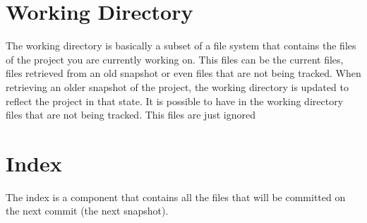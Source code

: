 \section{Working Directory}

The working directory is basically a subset of
a file system that contains the files of the project you are
currently working on. This files can be the current files, files
retrieved from an old snapshot or even files that are not being
tracked. When retrieving an older snapshot of the project, the
working directory is updated to reflect the project in that state. It
is possible to have in the working directory files that are not being
tracked. This files are just ignored

\section{Index}
The index is a component that contains all the files that will be committed
on the next commit (the next snapshot).

